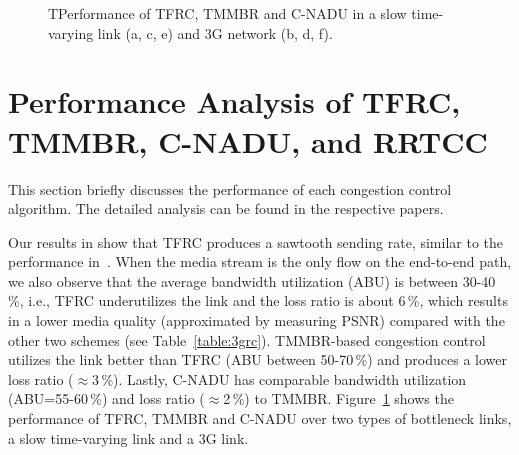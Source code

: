 \begin{figure}[!t]
  \centerline{
  }
  \centerline{
  }
  \centerline{
  }
  \caption{TPerformance of TFRC, TMMBR and C-NADU in a slow
  time-varying link (a, c, e) and 3G network (b, d, f).}
  \label{fig:3grc}
\end{figure}


\begin{table}[!t]
\caption{Comparing TFRC, TMMBR, C-NADU for calls over mobile nodes (180\,\emph{s}
simulations using 3G traces).}
\label{table:3grc}
\end{table}

\section{Performance Analysis of TFRC, TMMBR, C-NADU, and RRTCC}

This section briefly discusses the performance of each congestion control
algorithm. The detailed analysis can be found in the respective papers.

Our results in  show that TFRC produces a sawtooth sending
rate, similar to the performance in~\cite{saurin:2006:thesis}. When the media
stream is the only flow on the end-to-end path, we also observe that the average
bandwidth utilization (ABU) is between 30-40\,\%, i.e., TFRC underutilizes the
link and the loss ratio is about 6\,\%, which results in a lower media quality
(approximated by measuring PSNR) compared with the other two schemes (see
Table~\ref{table:3grc}). TMMBR-based congestion control utilizes the link
better than TFRC (ABU between 50-70\,\%) and produces a lower loss ratio
($\approx$3\,\%). Lastly, C-NADU has comparable bandwidth utilization
(ABU=55-60\,\%) and loss ratio ($\approx$2\,\%) to TMMBR.
Figure~\ref{fig:3grc} shows the performance of TFRC, TMMBR and C-NADU over two
types of bottleneck links, a slow time-varying link and a 3G link.


